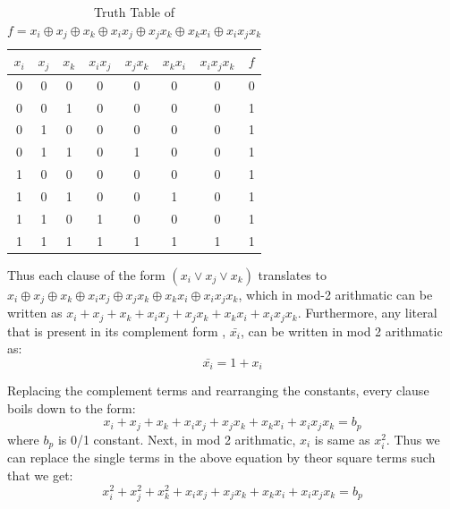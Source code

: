 \documentclass{article}
\begin{document}
\begin{table}[ht]
  \caption{Truth Table of $f = x_{i}\oplus x_{j} \oplus x_{k} \oplus x_{i}x_{j} \oplus x_{j}x_{k} \oplus x_{k}x_{i} \oplus x_{i}x_{j}x_{k}$}
  \centering
  \begin{tabular}{c c c c c c c c}
  \hline\hline
  $x_{i}$ & $x_{j}$ & $x_{k}$ & $x_{i}x_{j}$ & $x_{j}x_{k}$ & $x_{k}x_{i}$ & $x_{i}x_{j}x_{k}$ & $f$ \\[0.5ex]
  \hline
  0 & 0 & 0 & 0 & 0 & 0 & 0 & 0 \\
  0 & 0 & 1 & 0 & 0 & 0 & 0 & 1 \\
  0 & 1 & 0 & 0 & 0 & 0 & 0 & 1 \\
  0 & 1 & 1 & 0 & 1 & 0 & 0 & 1 \\
  1 & 0 & 0 & 0 & 0 & 0 & 0 & 1 \\
  1 & 0 & 1 & 0 & 0 & 1 & 0 & 1 \\
  1 & 1 & 0 & 1 & 0 & 0 & 0 & 1 \\
  1 & 1 & 1 & 1 & 1 & 1 & 1 & 1 \\ [0.5ex]  
  \end{tabular}
  \label{table:nonlin}
  \end{table}	  

  Thus each clause of the form $(x_{i} \vee x_{j} \vee x_{k})$ translates to $x_{i}\oplus x_{j} \oplus x_{k} \oplus x_{i}x_{j} \oplus x_{j}x_{k} \oplus x_{k}x_{i} \oplus x_{i}x_{j}x_{k}$, which in mod-2 arithmatic can be written as $x_{i} + x_{j} + x_{k} + x_{i}x_{j} + x_{j}x_{k} + x_{k}x_{i} + x_{i}x_{j}x_{k}$. \newline
Furthermore, any literal that is present in its complement form , $\bar{x_{i}}$, can be written in mod 2 arithmatic as:
\[ \bar{x_{i}} = 1 + x_{i} \]

Replacing the complement terms and rearranging the constants, every clause boils down to the form: \newline
\[ x_{i} + x_{j} + x_{k} + x_{i}x_{j} + x_{j}x_{k} + x_{k}x_{i} + x_{i}x_{j}x_{k} = b_{p} \]
where $b_{p}$ is 0/1 constant. \newline
Next, in mod 2 arithmatic, $x_{i}$ is same as $x_{i}^2$. Thus we can replace the single terms in the above equation by theor square terms such that we get: \newline
\begin{equation}
 x_{i}^2 + x_{j}^2 + x_{k}^2 + x_{i}x_{j} + x_{j}x_{k} + x_{k}x_{i} + x_{i}x_{j}x_{k} = b_{p} 
\end{equation}
\end{document}
